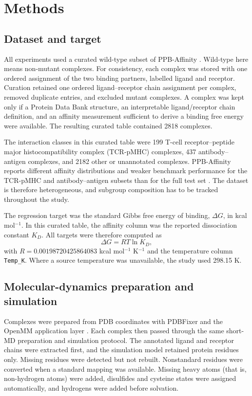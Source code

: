 \chapter{Methods}
\label{chap:methods}

\section{Dataset and target}

All experiments used a curated wild-type subset of PPB-Affinity \citep{Liu2024PPBAffinity}. Wild-type here means non-mutant complexes. For consistency, each complex was stored with one ordered assignment of the two binding partners, labelled ligand and receptor. Curation retained one ordered ligand--receptor chain assignment per complex, removed duplicate entries, and excluded mutant complexes. A complex was kept only if a Protein Data Bank structure, an interpretable ligand/receptor chain definition, and an affinity measurement sufficient to derive a binding free energy were available. The resulting curated table contained 2818 complexes.

The interaction classes in this curated table were 199 T-cell receptor--peptide major histocompatibility complex (TCR-pMHC) complexes, 437 antibody--antigen complexes, and 2182 other or unannotated complexes. PPB-Affinity reports different affinity distributions and weaker benchmark performance for the TCR-pMHC and antibody--antigen subsets than for the full test set \citep{Liu2024PPBAffinity}. The dataset is therefore heterogeneous, and subgroup composition has to be tracked throughout the study.

The regression target was the standard Gibbs free energy of binding, $\Delta G$, in kcal mol$^{-1}$. In this curated table, the affinity column was the reported dissociation constant $K_D$. All targets were therefore computed as
\begin{equation}
\Delta G = RT \ln K_D,
\end{equation}
with $R = 0.00198720425864083$ kcal mol$^{-1}$ K$^{-1}$ and the temperature column \texttt{Temp\_K}. Where a source temperature was unavailable, the study used 298.15 K.

\section{Molecular-dynamics preparation and simulation}

Complexes were prepared from PDB coordinates with PDBFixer and the OpenMM application layer \citep{PDBFixerSoftware,Eastman2024OpenMM8}. Each complex then passed through the same short-MD preparation and simulation protocol. The annotated ligand and receptor chains were extracted first, and the simulation model retained protein residues only. Missing residues were detected but not rebuilt. Nonstandard residues were converted when a standard mapping was available. Missing heavy atoms (that is, non-hydrogen atoms) were added, disulfides and cysteine states were assigned automatically, and hydrogens were added before solvation.

